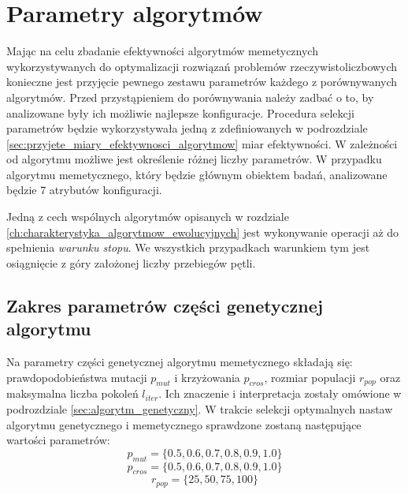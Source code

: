 \section{Parametry algorytmów}
\label{sec:parametry_algorytmow}
\par
Mając na celu zbadanie efektywności algorytmów memetycznych wykorzystywanych do optymalizacji rozwiązań problemów rzeczywistoliczbowych konieczne jest przyjęcie pewnego zestawu parametrów każdego z porównywanych algorytmów. Przed przystąpieniem do porównywania należy zadbać o to, by analizowane były ich możliwie najlepsze konfiguracje. Procedura selekcji parametrów będzie wykorzystywała jedną z zdefiniowanych w podrozdziale \ref{sec:przyjete_miary_efektywnosci_algorytmow} miar efektywności. W zależności od algorytmu możliwe jest określenie różnej liczby parametrów. W przypadku algorytmu memetycznego, który będzie głównym obiektem badań, analizowane będzie 7 atrybutów konfiguracji.
\par
Jedną z cech wspólnych algorytmów opisanych w rozdziale \ref{ch:charakterystyka_algorytmow_ewolucyjnych} jest wykonywanie operacji aż do spełnienia \emph{warunku stopu}. We wszystkich przypadkach warunkiem tym jest osiągnięcie z góry założonej liczby przebiegów pętli. 
\subsection{Zakres parametrów części genetycznej algorytmu}
%
Na parametry części genetycznej algorytmu memetycznego składają się: prawdopodobieństwa mutacji $p_{mut}$ i krzyżowania $p_{cros}$, rozmiar populacji $r_{pop}$ oraz maksymalna liczba pokoleń $l_{iter}$. Ich znaczenie i interpretacja zostały omówione w podrozdziale \ref{sec:algorytm_genetyczny}. W trakcie selekcji optymalnych nastaw algorytmu genetycznego i memetycznego sprawdzone zostaną następujące wartości parametrów:
\[p_{mut} = \lbrace0.5, 0.6, 0.7, 0.8, 0.9, 1.0\rbrace\]
\[p_{cros} = \lbrace0.5, 0.6, 0.7, 0.8, 0.9, 1.0\rbrace\]
\[r_{pop}=\lbrace25, 50, 75, 100\rbrace\]


